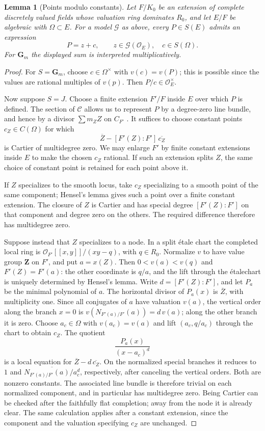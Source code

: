 \documentclass[11pt,a4paper]{article}
\numberwithin{equation}{section}
\theoremstyle{plain}
\newtheorem{lemma}[theorem]{Lemma}
\theoremstyle{definition}
\theoremstyle{remark}
\newcommand{\etale}{\'etale}
\renewcommand{\S}{\ensuremath{\mathsection}}
\begin{document}
\begin{lemma}[Points modulo constants]
\label{loc:point-correction}
Let $F/K_0$ be an extension of complete discretely valued fields whose
valuation ring dominates $R_0$, and let $E/F$ be algebraic with
$\Omega\subset E$.  For a model $\mathcal G$ as above, every
$P\in S(E)$ admits an expression
\[
                         P=z+c,
 \qquad z\in\mathcal G(\mathcal O_E),\quad c\in S(\Omega).
\]
For $\mathbf G_m$ the displayed sum is interpreted multiplicatively.
\end{lemma}
\begin{proof}
For $S=\mathbf G_m$, choose $c\in\Omega^\times$ with $v(c)=v(P)$;
this is possible since the values are rational multiples of $v(p)$.
Then $P/c\in\mathcal O_E^\times$.

Now suppose $S=J$.  Choose a finite extension $F'/F$ inside $E$ over
which $P$ is defined.  The section of $\mathcal C$ allows us to represent
$P$ by a degree-zero line bundle, and hence by a divisor $\sum m_ZZ$
on $C_{F'}$ \cite[\S8.1, Proposition~4]{BLR1990}.
It suffices to choose constant points $c_Z\in C(\Omega)$ for which
\[
       \overline Z-[F'(Z):F']\,\overline{c_Z}
\]
is Cartier of multidegree zero.  We may enlarge $F'$ by finite constant
extensions inside $E$ to make the chosen $c_Z$ rational.  If such an
extension splits $Z$, the same choice of constant point is retained for
each point above it.

If $Z$ specializes to the smooth locus, take $c_Z$ specializing to a
smooth point of the same component; Hensel's lemma gives such a point
over a finite constant extension.  The closure of $Z$ is Cartier and
has special degree $[F'(Z):F']$ on that component and degree zero on
the others.  The required difference therefore has multidegree zero.

Suppose instead that $Z$ specializes to a node.  In a split \etale
chart the completed local ring is $\mathcal O_{F'}[[x,y]]/(xy-q)$, with
$q\in R_0$.  Normalize $v$ to have value group $\mathbf Z$ on $F'$,
and put $a=x(Z)$.  Then $0<v(a)<v(q)$ and $F'(Z)=F'(a)$: the other
coordinate is $q/a$, and the lift through the \etale chart is uniquely
determined by Hensel's
lemma.  Write $d=[F'(Z):F']$, and let $P_a$ be the minimal polynomial
of $a$.  The horizontal divisor of $P_a(x)$ is $\overline Z$, with
multiplicity one.  Since all conjugates of $a$ have valuation $v(a)$,
the vertical order along the branch $x=0$ is
$v(N_{F'(a)/F'}(a))=d\,v(a)$; along the other branch it is zero.
Choose $a_c\in\Omega$ with $v(a_c)=v(a)$ and lift $(a_c,q/a_c)$ through
the chart to obtain $c_Z$.
The quotient
\[
                  \frac{P_a(x)}{(x-a_c)^d}
\]
is a local equation for $\overline Z-d\,\overline{c_Z}$.  On the
normalized special branches it reduces to $1$ and
$\overline{N_{F'(a)/F'}(a)/a_c^d}$, respectively, after canceling the
vertical orders.  Both are nonzero constants.  The associated line bundle is
therefore trivial on each normalized component, and in particular has
multidegree zero.  Being Cartier can be checked after the faithfully
flat completion; away from the node it is already clear.  The same
calculation applies after a constant extension, since the component and
the valuation specifying $c_Z$ are unchanged.


\end{proof}
\end{document}
